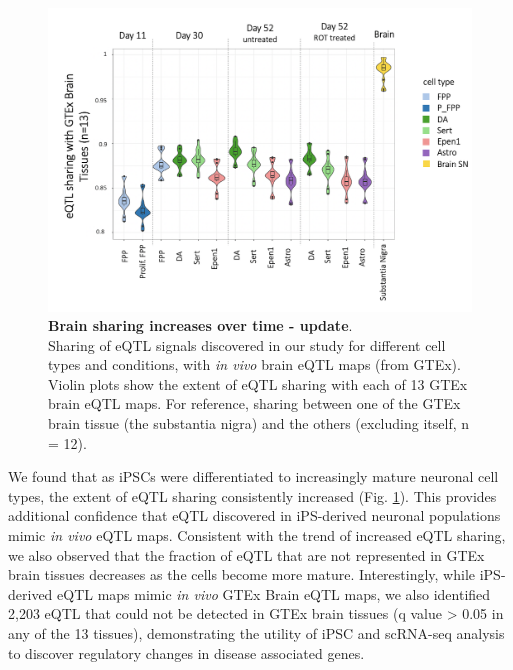 \begin{figure}[h]
\centering
\includegraphics[width=16cm]{Chapter5/Fig/neuroseq_gtex_brain_boxplots.png}
\caption[Brain sharing increase]{\textbf{Brain sharing increases over time - update}.\\
Sharing of eQTL signals discovered in our study for different cell types and conditions, 
with \textit{in vivo} brain eQTL maps (from GTEx). 
Violin plots show the extent of eQTL sharing with each of 13 GTEx brain eQTL maps.
For reference, sharing between one of the GTEx brain tissue (the substantia nigra) and the others (excluding itself, n = 12).}
\label{fig:neuroseq_and_gtex_brain_sharing}
\end{figure}

We found that as iPSCs were differentiated to increasingly mature neuronal cell types, the extent of eQTL sharing consistently increased (Fig. \ref{fig:neuroseq_and_gtex_brain_sharing}). 
This provides additional confidence that eQTL discovered in iPS-derived neuronal populations mimic \textit{in vivo} eQTL maps. 
Consistent with the trend of increased eQTL sharing, we also observed that the fraction of eQTL that are not represented in GTEx brain tissues decreases as the cells become more mature. 
Interestingly, while iPS-derived eQTL maps mimic \textit{in vivo} GTEx Brain eQTL maps, we also identified 2,203 eQTL that could not be detected in GTEx brain tissues (q value > 0.05 in any of the 13 tissues), demonstrating the utility of iPSC and scRNA-seq analysis to discover regulatory changes in disease associated genes. \\

